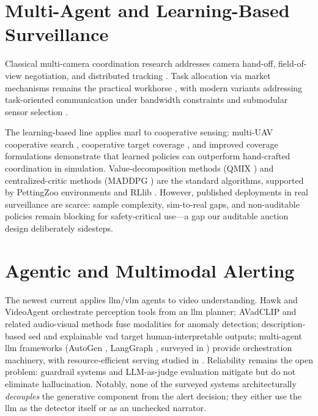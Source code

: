 \section{Multi-Agent and Learning-Based Surveillance}

Classical multi-camera coordination research addresses camera hand-off, field-of-view negotiation, and distributed tracking \cite{amosa2023multicamera, sanmiguel2022detection}. Task allocation via market mechanisms remains the practical workhorse \cite{smith1980contract, parker2002alliance}, with modern variants addressing task-oriented communication under bandwidth constraints \cite{zhang2026taskoriented} and submodular sensor selection \cite{liu2026submodular}.

The learning-based line applies \gls{marl} to cooperative sensing: multi-UAV cooperative search \cite{zheng2026multiuav}, cooperative target coverage \cite{yang2025multiagent}, and improved coverage formulations \cite{wang2026improved} demonstrate that learned policies can outperform hand-crafted coordination in simulation. Value-decomposition methods (QMIX \cite{rashid2018qmix}) and centralized-critic methods (MADDPG \cite{lowe2017multiagent}) are the standard algorithms, supported by PettingZoo environments \cite{terry2021pettingzoo} and RLlib \cite{liang2018rllib}. However, published deployments in real surveillance are scarce: sample complexity, sim-to-real gaps, and non-auditable policies remain blocking for safety-critical use---a gap our auditable auction design deliberately sidesteps.

\section{Agentic and Multimodal Alerting}

The newest current applies \gls{llm}/\gls{vlm} agents to video understanding. Hawk \cite{cheng2025hawk} and VideoAgent \cite{fan2024videoagent} orchestrate perception tools from an \gls{llm} planner; AVadCLIP \cite{wu2025avadclip} and related audio-visual methods \cite{ustun2026multimodal} fuse modalities for anomaly detection; description-based \gls{sed} \cite{nishida2026description} and explainable \gls{vad} \cite{huang2025exvad, alkahtani2026explainable} target human-interpretable outputs; multi-agent \gls{llm} frameworks (AutoGen \cite{wu2023autogen}, LangGraph \cite{langgraph2024}, surveyed in \cite{sapkota2025ai, fan2024survey, duan2024exploration}) provide orchestration machinery, with resource-efficient serving studied in \cite{chaudhry2024murakkab}. Reliability remains the open problem: guardrail systems \cite{rebedea2023nemo} and LLM-as-judge evaluation \cite{zheng2023judging} mitigate but do not eliminate hallucination. Notably, none of the surveyed systems architecturally \emph{decouples} the generative component from the alert decision; they either use the \gls{llm} as the detector itself or as an unchecked narrator.


